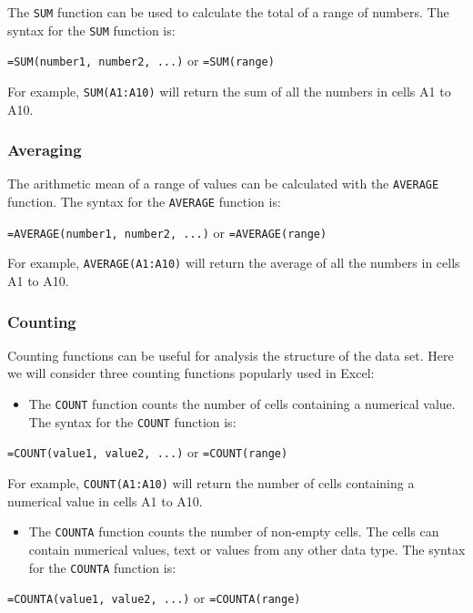 \documentclass[
]{book}
\providecommand{\tightlist}{%
  \setlength{\itemsep}{0pt}\setlength{\parskip}{0pt}}
\begin{document}
The \texttt{SUM} function can be used to calculate the total of a range of numbers. The syntax for the \texttt{SUM} function is:

\texttt{=SUM(number1,\ number2,\ ...)} or \texttt{=SUM(range)}

For example, \texttt{SUM(A1:A10)} will return the sum of all the numbers in cells A1 to A10.

\subsubsection*{Averaging}\label{averaging}

The arithmetic mean of a range of values can be calculated with the \texttt{AVERAGE} function. The syntax for the \texttt{AVERAGE} function is:

\texttt{=AVERAGE(number1,\ number2,\ ...)} or \texttt{=AVERAGE(range)}

For example, \texttt{AVERAGE(A1:A10)} will return the average of all the numbers in cells A1 to A10.

\subsubsection*{Counting}\label{counting}

Counting functions can be useful for analysis the structure of the data set. Here we will consider three counting functions popularly used in Excel:

\begin{itemize}
\tightlist
\item
  The \texttt{COUNT} function counts the number of cells containing a numerical value. The syntax for the \texttt{COUNT} function is:
\end{itemize}

\texttt{=COUNT(value1,\ value2,\ ...)} or \texttt{=COUNT(range)}

For example, \texttt{COUNT(A1:A10)} will return the number of cells containing a numerical value in cells A1 to A10.

\begin{itemize}
\tightlist
\item
  The \texttt{COUNTA} function counts the number of non-empty cells. The cells can contain numerical values, text or values from any other data type. The syntax for the \texttt{COUNTA} function is:
\end{itemize}

\texttt{=COUNTA(value1,\ value2,\ ...)} or \texttt{=COUNTA(range)}
\end{document}
